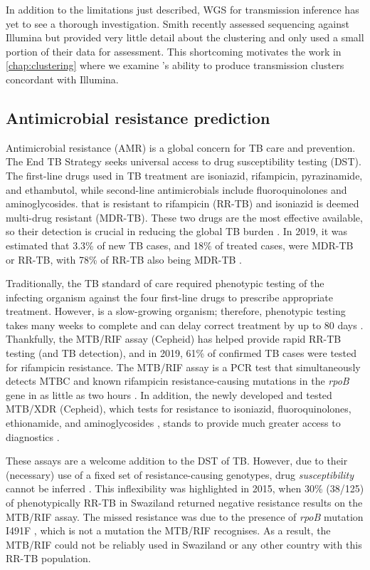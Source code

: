 In addition to the limitations just described, \ont{} WGS for transmission inference has yet to see a thorough investigation. Smith \etal{} recently assessed \ont{} sequencing against Illumina but provided very little detail about the clustering and only used a small portion of their data for assessment. This shortcoming motivates the work in \autoref{chap:clustering} where we examine \ont{}'s ability to produce transmission clusters concordant with Illumina.

\subsection{Antimicrobial resistance prediction}
\label{sec:amr}

Antimicrobial resistance (AMR) is a global concern for TB care and prevention. The End TB Strategy seeks universal access to drug susceptibility testing (DST). The first-line drugs used in TB treatment are isoniazid, rifampicin, pyrazinamide, and ethambutol, while second-line antimicrobials include fluoroquinolones and aminoglycosides. \mtb{} that is resistant to rifampicin (RR-TB) and isoniazid is deemed multi-drug resistant (MDR-TB). These two drugs are the most effective available, so their detection is crucial in reducing the global TB burden \cite{who2020}. In 2019, it was estimated that 3.3\% of new TB cases, and 18\% of treated cases, were MDR-TB or RR-TB, with 78\% of RR-TB also being MDR-TB \cite{who2020}.

Traditionally, the TB standard of care required phenotypic testing of the infecting organism against the four first-line drugs to prescribe appropriate treatment. However, \mtb{} is a slow-growing organism; therefore, phenotypic testing takes many weeks to complete and can delay correct treatment by up to 80 days \cite{Pankhurst2016}. Thankfully, the \xpert{} MTB/RIF assay (Cepheid) has helped provide rapid RR-TB testing (and TB detection), and in 2019, 61\% of confirmed TB cases were tested for rifampicin resistance. The \xpert{} MTB/RIF assay is a PCR test that simultaneously detects MTBC and known rifampicin resistance-causing mutations in the \textit{rpoB} gene in as little as two hours \cite{Boehme2011}. In addition, the newly developed and tested \xpert{} MTB/XDR (Cepheid), which tests for resistance to isoniazid, fluoroquinolones, ethionamide, and aminoglycosides \cite{Cao2021}, stands to provide much greater access to diagnostics \cite{Bainomugisa2020}.

These \xpert{} assays are a welcome addition to the DST of TB. However, due to their (necessary) use of a fixed set of resistance-causing genotypes, drug \emph{susceptibility} cannot be inferred \cite{Sanchez2015}. This inflexibility was highlighted in 2015, when 30\% (38/125) of phenotypically RR-TB in Swaziland returned negative resistance results on the \xpert{} MTB/RIF assay. The missed resistance was due to the presence of \textit{rpoB} mutation I491F \cite{Sanchez2015}, which is not a mutation the \xpert{} MTB/RIF recognises. As a result, the \xpert{} MTB/RIF could not be reliably used in Swaziland or any other country with this RR-TB population.


